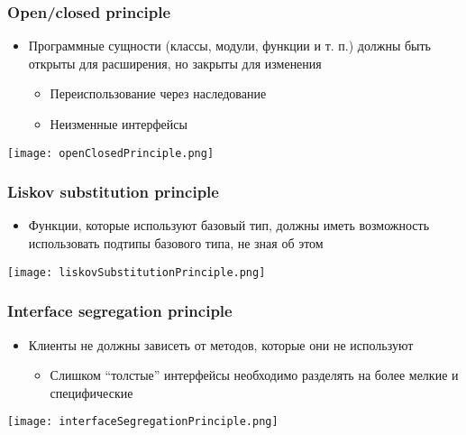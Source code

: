 \documentclass{../../slides-style}
\begin{document}
    \begin{frame}
        \frametitle{Open/closed principle}
        \begin{itemize}
            \item Программные сущности (классы, модули, функции и т. п.) должны быть открыты для расширения, но закрыты для изменения
            \begin{itemize}
                \item Переиспользование через наследование
                \item Неизменные интерфейсы
            \end{itemize}
        \end{itemize}
        \begin{flushright}
            \texttt{[image: openClosedPrinciple.png]}
        \end{flushright}
    \end{frame}

    \begin{frame}
        \frametitle{Liskov substitution principle}
        \begin{itemize}
            \item Функции, которые используют базовый тип, должны иметь возможность использовать подтипы базового типа, не зная об этом
        \end{itemize}
        \begin{flushright}
            \texttt{[image: liskovSubstitutionPrinciple.png]}
        \end{flushright}
    \end{frame}

    \begin{frame}
        \frametitle{Interface segregation principle}
        \begin{itemize}
            \item Клиенты не должны зависеть от методов, которые они не используют
            \begin{itemize}
                \item Слишком ``толстые'' интерфейсы необходимо разделять на более мелкие и специфические
            \end{itemize}
        \end{itemize}
        \begin{flushright}
            \texttt{[image: interfaceSegregationPrinciple.png]}
        \end{flushright}
    \end{frame}
\end{document}
